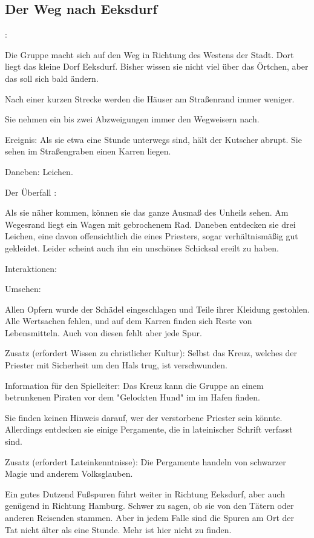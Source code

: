 
\subsection{Der Weg nach Eeksdurf}


:

Die Gruppe macht sich auf den Weg in Richtung des Westens der Stadt. Dort liegt das kleine Dorf Eeksdurf. Bisher wissen sie nicht viel über das Örtchen, aber das soll sich bald ändern.

Nach einer kurzen Strecke werden die Häuser am Straßenrand immer weniger.

Sie nehmen ein bis zwei Abzweigungen immer den Wegweisern nach.

Ereignis: Als sie etwa eine Stunde unterwegs sind, hält der Kutscher abrupt. Sie sehen im Straßengraben einen Karren liegen.

Daneben: Leichen.


Der Überfall
:

Als sie näher kommen, können sie das ganze Ausmaß des Unheils sehen. Am Wegesrand liegt ein Wagen mit gebrochenem Rad. Daneben entdecken sie drei Leichen, eine davon offensichtlich die eines Priesters, sogar verhältnismäßig gut gekleidet. Leider scheint auch ihn ein unschönes Schicksal ereilt zu haben.

Interaktionen:

Umsehen:

Allen Opfern wurde der Schädel eingeschlagen und Teile ihrer Kleidung gestohlen.
Alle Wertsachen fehlen, und auf dem Karren finden sich Reste von Lebensmitteln. Auch von diesen fehlt aber jede Spur.

Zusatz (erfordert Wissen zu christlicher Kultur): Selbst das Kreuz, welches der Priester mit Sicherheit um den Hals trug, ist verschwunden.

Information für den Spielleiter: Das Kreuz kann die Gruppe an einem betrunkenen Piraten vor dem "Gelockten Hund" im im Hafen finden.

Sie finden keinen Hinweis darauf, wer der verstorbene Priester sein könnte. Allerdings entdecken sie einige Pergamente, die in lateinischer Schrift verfasst sind.

Zusatz (erfordert Lateinkenntnisse): Die Pergamente handeln von schwarzer Magie und anderem Volksglauben.

Ein gutes Dutzend Fußspuren führt weiter in Richtung Eeksdurf, aber auch genügend in Richtung Hamburg. Schwer zu sagen, ob sie von den Tätern oder anderen Reisenden stammen. Aber in jedem Falle sind die Spuren am Ort der Tat nicht älter als eine Stunde. Mehr ist hier nicht zu finden.


